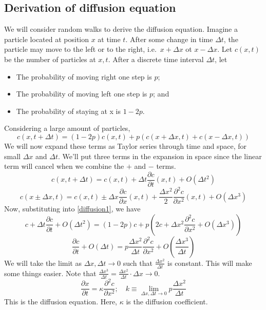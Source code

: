 \subsection{Derivation of diffusion equation}
We will consider random walks to derive the diffusion equation.
Imagine a particle located at position \(x\) at time \(t\).
After some change in time \(\Delta t\), the particle may move to the left or to the right, i.e.\ \(x+\Delta x\) ot \(x-\Delta x\).
Let \(c(x, t)\) be the number of particles at \(x, t\).
After a discrete time interval \(\Delta t\), let
\begin{itemize}
	\item The probability of moving right one step is \(p\);
	\item The probability of moving left one step is \(p\); and
	\item The probability of staying at x is \(1-2p\).
\end{itemize}
Considering a large amount of particles,
\begin{equation}\label{diffusion1}
	c(x, t+\Delta t) = (1-2p)c(x, t) + p\left( c(x+\Delta x, t) + c(x-\Delta x, t) \right)
\end{equation}
We will now expand these terms as Taylor series through time and space, for small \(\Delta x\) and \(\Delta t\).
We'll put three terms in the expansion in space since the linear term will cancel when we combine the \(+\) and \(-\) terms.
\[
	c(x, t+\Delta t) = c(x, t) + \Delta t \frac{\partial c}{\partial t}(x, t) + O(\Delta t^2)
\]
\[
	c(x\pm\Delta x, t) = c(x, t) \pm \Delta x \frac{\partial c}{\partial x}(x, t) + \frac{\Delta x^2}{2}\frac{\partial^2 c}{\partial x^2}(x, t) + O(\Delta x^3)
\]
Now, substituting into \eqref{diffusion1}, we have
\[
	c + \Delta t \frac{\partial c}{\partial t} + O(\Delta t^2) = (1-2p)c + p\left( 2c + \Delta x^2\frac{\partial^2 c}{\partial x^2} + O(\Delta x^3) \right)
\]
\[
	\frac{\partial c}{\partial t} + O(\Delta t) = p\frac{\Delta x^2}{\Delta t}\frac{\partial^2 c}{\partial x^2} + O\left(\frac{\Delta x^3}{\Delta t}\right)
\]
We will take the limit as \(\Delta x, \Delta t \to 0\) such that \(\frac{\Delta x^2}{\Delta t}\) is constant.
This will make some things easier.
Note that \(\frac{\Delta x^3}{\Delta t} = \frac{\Delta x^2}{\Delta t} \cdot \Delta x \to 0\).
\[
	\frac{\partial x}{\partial t} = \kappa\frac{\partial^2 c}{\partial x^2};\quad k \equiv \lim_{\Delta x,\Delta t \to 0}p\frac{\Delta x^2}{\Delta t}
\]
This is the diffusion equation.
Here, \(\kappa\) is the diffusion coefficient.

